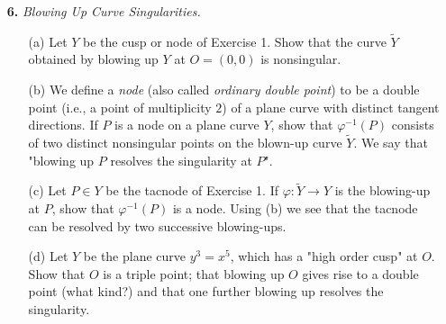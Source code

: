 \documentclass{article}
\begin{document}
\begin{enumerate} [label=\textbf{\arabic*.}, leftmargin=0cm]
\begin{proof}
\begin{itemize} [leftmargin=0cm]
        \item[(b)] (a), (b), and (c) has multiplicity $2$, and (d) has multiplicity $3$ at $O$.
    \end{itemize}
\end{proof}

\item[\textbf{6.}] \textit{Blowing Up Curve Singularities.}
\begin{itemize}
    \item[(a)] Let $Y$ be the cusp or node of Exercise 1.
    Show that the curve $\widetilde{Y}$ obtained by blowing up $Y$ at $O = (0, 0)$ is nonsingular.

    \item[(b)] We define a \textit{node} (also called \textit{ordinary double point}) to be a double point (i.e., a point of multiplicity $2$) of a plane curve with distinct tangent directions.
    If $P$ is a node on a plane curve $Y$, show that $\varphi^{-1}(P)$ consists of two distinct nonsingular points on the blown-up curve $\widetilde{Y}$.
    We say that "blowing up $P$ resolves the singularity at $P$".

    \item[(c)] Let $P \in Y$ be the tacnode of Exercise 1.
    If $\varphi : \widetilde{Y} \to Y$ is the blowing-up at $P$, show that $\varphi^{-1}(P)$ is a node.
    Using (b) we see that the tacnode can be resolved by two successive blowing-ups.

    \item[(d)] Let $Y$ be the plane curve $y^3 = x^5$, which has a "high order cusp" at $O$.
    Show that $O$ is a triple point; that blowing up $O$ gives rise to a double point (what kind?) and that one further blowing up resolves the singularity.
\end{itemize}


\end{enumerate}
\end{document}
